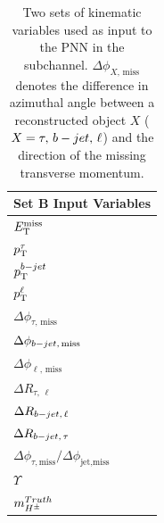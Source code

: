 \begin{table}[!thp]
				\begin{subtable}[c]{0.25\textwidth}
					\centering
					\begin{tabular}{| l |}
						\hline
						\textbf{Set B Input Variables} \\
						\hline \hline
						$E_\text{T}^\text{miss}$  \\
						$p_{\text{T}}^{\tau}$  \\
						$p_{\text{T}}^{b-jet}$  \\
						$p_{\text{T}}^{\ell}$  \\
						$\Delta \phi_{\tau,\,\text{miss}}$  \\
						$\Delta \phi_{b-jet,\,\text{miss}}$  \\
						$\Delta \phi_{\ell,\,\text{miss}}$  \\
						$\Delta R_{\tau,\,\ell}$ \\
						$\Delta R_{b-jet,\,\ell}$ \\
						$\Delta R_{b-jet,\,\tau}$ \\
						$\Delta \phi_{\tau, \text{miss}} / \Delta \phi_{\text{jet}, \text{miss}}$  \\
						$\Upsilon$ \\
						$m_{H^{\pm}}^{Truth}$ \\ \hline
					\end{tabular}
				\end{subtable}
				\caption{Two sets of kinematic variables used as input to the \gls{PNN} in the \taulep subchannel. $\Delta \phi_{X,\,\text{miss}}$ denotes the difference in azimuthal angle between a reconstructed object $X$ ($X = \tau,\,b-jet,\,\ell$) and the direction of the missing transverse momentum.}
				\label{tab:taulep-input-variables-high-v-low}
			\end{table}

